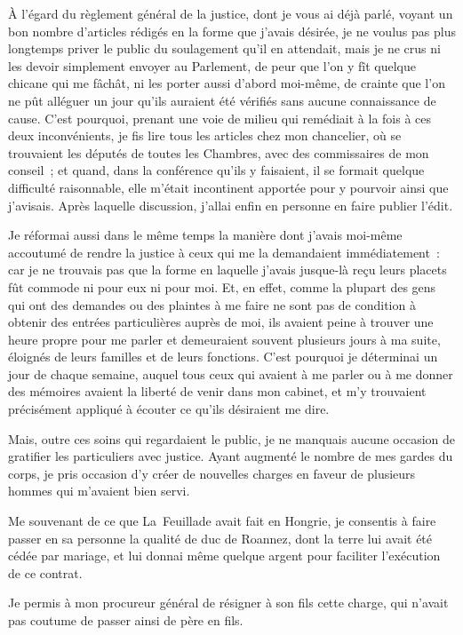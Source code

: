 \documentclass[french,twoside]{book} %
\begin{document}
À l’égard du règlement général de la justice, dont je vous ai déjà parlé, voyant un bon nombre d’articles rédigés en la forme que j’avais désirée, je ne voulus pas plus longtemps priver le public du soulagement qu’il en attendait, mais je ne crus ni les devoir simplement envoyer au Parlement, de peur que l’on y fît quelque chicane qui me fâchât, ni les porter aussi d’abord moi-même, de crainte que l’on ne pût alléguer un jour qu’ils auraient été vérifiés sans aucune connaissance de cause. C’est pourquoi, prenant une voie de milieu qui remédiait à la fois à ces deux inconvénients, je fis lire tous les articles chez mon chancelier, où se trouvaient les députés de toutes les Chambres, avec des commissaires de mon conseil ; et quand, dans la conférence qu’ils y faisaient, il se formait quelque difficulté raisonnable, elle m’était incontinent apportée pour y pourvoir ainsi que j’avisais. Après laquelle discussion, j’allai enfin en personne en faire publier l’édit.\par
Je réformai aussi dans le même temps la manière dont j’avais moi-même accoutumé de rendre la justice à ceux qui me la demandaient immédiatement : car je ne trouvais pas que la forme en laquelle j’avais jusque-là reçu leurs placets fût commode ni pour eux ni pour moi. Et, en effet, comme la plupart des gens qui ont des demandes ou des plaintes à me faire ne sont pas de condition à obtenir des entrées particulières auprès de moi, ils avaient peine à trouver une heure propre pour me parler et demeuraient souvent plusieurs jours à ma suite, éloignés de leurs familles et de leurs fonctions. C’est pourquoi je déterminai un jour de chaque semaine, auquel tous ceux qui avaient à me parler ou à me donner des mémoires avaient la liberté de venir dans mon cabinet, et m’y trouvaient précisément appliqué à écouter ce qu’ils désiraient me dire.\par
Mais, outre ces soins qui regardaient le public, je ne manquais aucune occasion de gratifier les particuliers avec justice. Ayant augmenté le nombre de mes gardes du corps, je pris occasion d’y créer de nouvelles charges en faveur de plusieurs hommes qui m’avaient bien servi.\par
Me souvenant de ce que La Feuillade avait fait en Hongrie, je consentis à faire passer en sa personne la qualité de duc de Roannez, dont la terre lui avait été cédée par mariage, et lui donnai même quelque argent pour faciliter l’exécution de ce contrat.\par
Je permis à mon procureur général de résigner à son fils cette charge, qui n’avait pas coutume de passer ainsi de père en fils.\par
\end{document}
